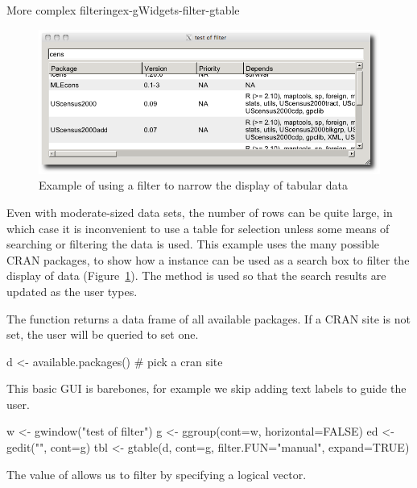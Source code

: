 \begin{example}{More complex filtering}{ex-gWidgets-filter-gtable}

\begin{figure}
  \centering
  \includegraphics[width=.8\textwidth]{fig-gWidgets-filter-example}
  \caption{Example of using a filter to narrow the display of tabular data}
  \label{fig:gWidgets-filter-example}
\end{figure}

Even with moderate-sized data sets, the number of rows can be quite large, in which case it is
inconvenient to use a table for selection unless some means of searching or filtering the
data is used. This example uses the many possible CRAN packages, to show how a
 instance can be used as a search box to filter the display of
data (Figure~\ref{fig:gWidgets-filter-example}). The  method is used so that the search
results are updated as the user types.


The  function returns a data frame of all
available packages. If a CRAN site is not set, the user will be
queried to set one.
\begin{Schunk}
\begin{Sinput}
 d <- available.packages()       # pick a cran site
\end{Sinput}
\end{Schunk}

This basic GUI is barebones, for example we skip adding text labels to guide the user. 
\begin{Schunk}
\begin{Sinput}
 w <- gwindow("test of filter")
 g <- ggroup(cont=w, horizontal=FALSE)
 ed <- gedit("", cont=g)
 tbl <- gtable(d, cont=g, filter.FUN="manual", expand=TRUE)
\end{Sinput}
\end{Schunk}
The  value of  allows us to
filter by specifying a logical vector.


\end{example}
